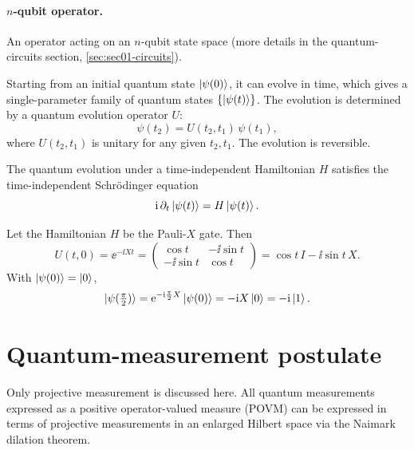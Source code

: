 \paragraph{$n$-qubit operator.} An operator acting on an $n$-qubit state space
(more details in the quantum-circuits section, \cref{sec:sec01-circuits}).

Starting from an initial quantum state $\ket{\psi(0)}$, it can evolve in time,
which gives a single-parameter family of quantum states $\{\ket{\psi(t)}\}$. The
evolution is determined by a quantum evolution operator $U$:
\begin{equation}
  \psi(t_2) = U(t_2, t_1)\,\psi(t_1),
\end{equation}
where $U(t_2, t_1)$ is unitary for any given $t_2, t_1$. The evolution is
reversible.

\begin{definition}
The quantum evolution under a time-independent Hamiltonian $H$ satisfies the
time-independent Schr\"odinger equation
\begin{equation}
  \mathrm{i}\,\partial_t \ket{\psi(t)} = H\ket{\psi(t)}.
\end{equation}
\end{definition}

\begin{example}
Let the Hamiltonian $H$ be the Pauli-$X$ gate. Then
\begin{equation}
  U(t, 0) = \ee^{-\ii X t}
  = \begin{pmatrix} \cos t & -\ii\sin t \\ -\ii\sin t & \cos t \end{pmatrix}
  = \cos t\, I - \ii\sin t\, X.
\end{equation}
With $\ket{\psi(0)} = \ket{0}$,
\begin{equation}
  \ket{\psi(\tfrac{\pi}{2})} = \mathrm{e}^{-\mathrm{i}\frac{\pi}{2}X}\ket{\psi(0)}
  = -\mathrm{i} X\ket{0} = -\mathrm{i}\ket{1}.
\end{equation}
\end{example}

\section{Quantum-measurement postulate}\label{sec:sec01-measurement}

Only projective measurement is discussed here. All quantum measurements
expressed as a positive operator-valued measure (POVM) can be expressed in terms
of projective measurements in an enlarged Hilbert space via the Naimark dilation
theorem.

